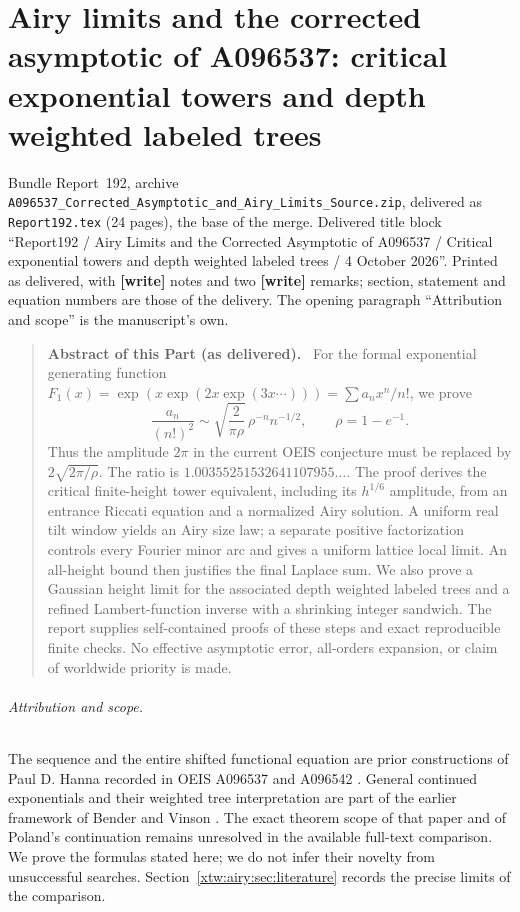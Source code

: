 \documentclass[11pt]{article}
\theoremstyle{remark}\newtheorem{remark}[theorem]{Remark}
\newcommand{\file}[1]{\nolinkurl{#1}}
\newenvironment{partabstract}{\begin{quote}\small\noindent\textbf{Abstract of this Part (as delivered).}\ }{\end{quote}}
\newcommand{\partsource}[1]{\par\noindent\begin{minipage}{\textwidth}\small #1\end{minipage}\par\medskip}
\begin{document}
\part{Airy limits and the corrected asymptotic of A096537: critical exponential towers and depth weighted labeled trees}\label{xtw:airy:part}
\partsource{Bundle Report~192, archive \file{A096537_Corrected_Asymptotic_and_Airy_Limits_Source.zip}, delivered as \file{Report192.tex} (24 pages), the base of the merge. Delivered title block ``Report192 / Airy Limits and the Corrected Asymptotic of A096537 / Critical exponential towers and depth weighted labeled trees / 4 October 2026''. Printed as delivered, with \textbf{[write]} notes and two \textbf{[write]} remarks; section, statement and equation numbers are those of the delivery. The opening paragraph ``Attribution and scope'' is the manuscript's own.}
\begin{partabstract}
For the formal exponential generating function
$F_1(x)=\exp(x\exp(2x\exp(3x\cdots)))=\sum a_nx^n/n!$, we prove
\[
 \frac{a_n}{(n!)^2}\sim\sqrt{\frac{2}{\pi\rho}}\,
 \rho^{-n}n^{-1/2},\qquad \rho=1-e^{-1}.
\]
Thus the amplitude $2\pi$ in the current OEIS conjecture must be replaced by
$2\sqrt{2\pi/\rho}$. The ratio is $1.00355251532641107955\ldots$.
The proof derives the critical finite-height tower equivalent, including its
$h^{1/6}$ amplitude, from an entrance Riccati equation and a normalized Airy
solution. A uniform real tilt window yields an Airy size law; a separate
positive factorization controls every Fourier minor arc and gives a uniform
lattice local limit. An all-height bound then justifies the final Laplace sum.
We also prove a Gaussian height limit for the associated depth weighted labeled
trees and a refined Lambert-function inverse with a shrinking integer sandwich.
The report supplies self-contained proofs of these steps and exact reproducible
finite checks. No effective asymptotic error, all-orders expansion, or claim of
worldwide priority is made.
\end{partabstract}

\paragraph{Attribution and scope.}
The sequence and the entire shifted functional equation are prior constructions
of Paul D. Hanna recorded in OEIS A096537 and A096542 \cite{oeis537,oeis542}.
General continued exponentials and their weighted tree interpretation are part
of the earlier framework of Bender and Vinson \cite{bv}. The exact theorem scope
of that paper and of Poland's continuation \cite{poland} remains unresolved in
the available full-text comparison. We prove the formulas stated here; we do not
infer their novelty from unsuccessful searches. Section~\ref{xtw:airy:sec:literature}
records the precise limits of the comparison.
\end{document}
